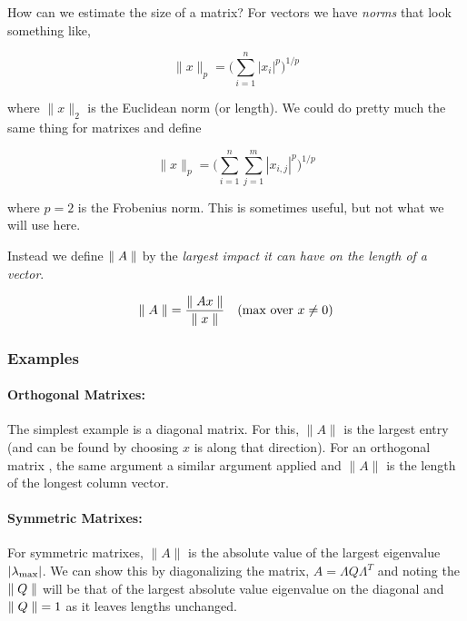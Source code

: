 \documentclass{article}
\newcommand{\norm}[1]{\mbox{\ensuremath{\parallel #1 \parallel}}}
\begin{document}
How can we estimate the size of a matrix? For vectors we have {\em norms\/} that look something like,

\begin{equation}
    \parallel x \parallel_p = \big( \sum_{i=1}^{n} |x_i|^p \big)^{1/p}
\end{equation}

\noindent
where  $\parallel x \parallel_2$ is the Euclidean norm (or length). We could do pretty much the same thing for matrixes and define

\begin{equation}
    \parallel x \parallel_p = \big( \sum_{i=1}^{n} \sum_{j=1}^{m} |x_{i, j}|^p \big)^{1/p}
\end{equation}

\noindent
where $p = 2$ is the Frobenius norm. This is sometimes useful, but not what we will use here.


Instead we define $\norm{A}$ by the {\em largest impact it can have on the length of a vector\/}.

\begin{equation}
    \norm{A} =  \frac{\norm{Ax}}{\norm{x}} \quad (\text{max over } x \ne 0)
    \label{eq:matrix_norm_definition}
\end{equation}

\subsubsection{Examples}

\paragraph{Orthogonal Matrixes:}
The simplest example is a diagonal matrix. For this, \norm{A} is the largest entry (and can be found by choosing $x$ is along that direction).
For an orthogonal matrix , the same argument a similar argument applied and \norm{A} is the length of the longest column vector.

\paragraph{Symmetric Matrixes:}
For symmetric matrixes, \norm{A} is the absolute value of the largest eigenvalue $| \lambda_{\rm max} | $. We can show this by diagonalizing the matrix, $A = \Lambda Q \Lambda^T$ and noting the $\norm{Q}$ will be that of the largest absolute value eigenvalue on the diagonal and $\norm{Q} = 1$ as it leaves lengths unchanged.
\end{document}
